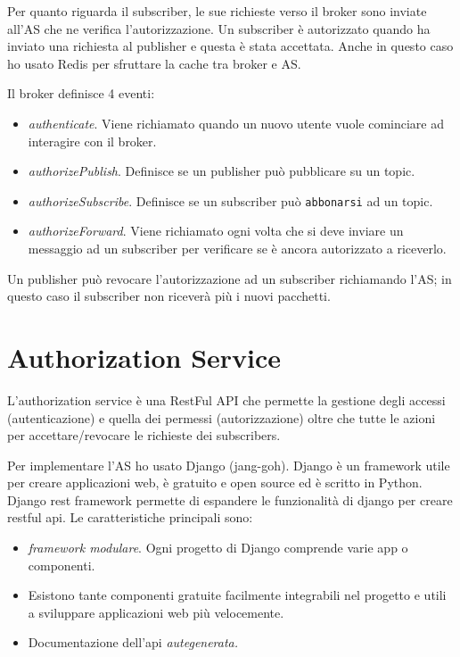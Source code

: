 Per quanto riguarda il subscriber, le sue richieste verso il broker sono inviate all'AS che ne verifica l'autorizzazione. Un subscriber è autorizzato quando ha inviato una richiesta al publisher e questa è stata accettata.
Anche in questo caso ho usato Redis per sfruttare la cache tra broker e AS.

Il broker definisce 4 eventi:
\begin{itemize}
    \item \emph{authenticate}. Viene richiamato quando un nuovo utente vuole cominciare ad interagire con il broker.
    \item \emph{authorizePublish}. Definisce se un publisher può pubblicare su un topic.
    \item \emph{authorizeSubscribe}. Definisce se un subscriber può \texttt{abbonarsi} ad un topic.
    \item \emph{authorizeForward}. Viene richiamato ogni volta che si deve inviare un messaggio ad un subscriber per verificare se è ancora autorizzato a riceverlo.
\end{itemize}

Un publisher può revocare l'autorizzazione ad un subscriber richiamando l'AS; in questo caso il subscriber non riceverà più i nuovi pacchetti.

\newpage
\section{Authorization Service}
L'authorization service è una RestFul API che permette la gestione degli accessi (autenticazione) e quella dei permessi (autorizzazione) oltre che tutte le azioni per accettare/revocare le richieste dei subscribers.

Per implementare l'AS ho usato Django (jang-goh).
Django è un framework utile per creare applicazioni web, è gratuito e open source ed è scritto in Python. 
Django rest framework permette di espandere le funzionalità di django per creare restful api.
Le caratteristiche principali sono:
\begin{itemize}
    \item \emph{framework modulare}. Ogni progetto di Django comprende varie app o componenti.
    \item Esistono tante componenti gratuite facilmente integrabili nel progetto e utili a sviluppare applicazioni web più velocemente.
    \item Documentazione dell'api \emph{autegenerata.}
\end{itemize}


